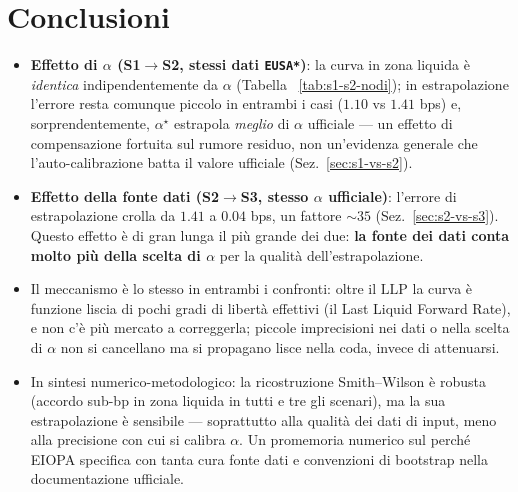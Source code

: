 \documentclass[11pt,a4paper]{article}
\theoremstyle{remark}
\newcommand{\LLP}{\ensuremath{\mathrm{LLP}}}
\begin{document}
\section{Conclusioni}

\begin{itemize}
  \item \textbf{Effetto di $\alpha$ (S1$\to$S2, stessi dati \texttt{EUSA*})}: la curva in
        zona liquida \`e \emph{identica} indipendentemente da $\alpha$ (Tabella~
        \ref{tab:s1-s2-nodi}); in estrapolazione l'errore resta comunque piccolo in entrambi i
        casi ($1.10$ vs $1.41$ bps) e, sorprendentemente, $\alpha^\star$ estrapola \emph{meglio}
        di $\alpha$ ufficiale --- un effetto di compensazione fortuita sul rumore residuo, non
        un'evidenza generale che l'auto-calibrazione batta il valore ufficiale
        (Sez.~\ref{sec:s1-vs-s2}).
  \item \textbf{Effetto della fonte dati (S2$\to$S3, stesso $\alpha$ ufficiale)}: l'errore di
        estrapolazione crolla da $1.41$ a $0.04$ bps, un fattore $\sim 35$
        (Sez.~\ref{sec:s2-vs-s3}). Questo effetto \`e di gran lunga il pi\`u grande dei due:
        \textbf{la fonte dei dati conta molto pi\`u della scelta di $\alpha$} per la qualit\`a
        dell'estrapolazione.
  \item Il meccanismo \`e lo stesso in entrambi i confronti: oltre il $\LLP$ la curva \`e
        funzione liscia di pochi gradi di libert\`a effettivi (il Last Liquid Forward Rate), e
        non c'\`e pi\`u mercato a correggerla; piccole imprecisioni nei dati o nella scelta di
        $\alpha$ non si cancellano ma si propagano lisce nella coda, invece di attenuarsi.
  \item In sintesi numerico-metodologico: la ricostruzione Smith--Wilson \`e robusta (accordo
        sub-bp in zona liquida in tutti e tre gli scenari), ma la sua estrapolazione \`e
        sensibile --- soprattutto alla qualit\`a dei dati di input, meno alla precisione con
        cui si calibra $\alpha$. Un promemoria numerico sul perch\'e EIOPA specifica con tanta
        cura fonte dati e convenzioni di bootstrap nella documentazione ufficiale.
\end{itemize}
\end{document}
